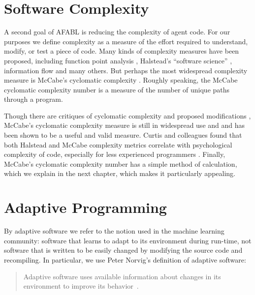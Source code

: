 



\section{Software Complexity}

A second goal of AFABL is reducing the complexity of agent code. For our purposes we define complexity as a measure of the effort required to understand, modify, or test a piece of code. Many kinds of complexity measures have been proposed, including function point analysis \cite{albrecht1979measuring}, Halstead's ``software science'' \cite{halstead1977elements}, information flow \cite{henry1981software} and many others. But perhaps the most widespread complexity measure is McCabe's cyclomatic complexity \cite{mccabe1976complexity,mccabe1989design}. Roughly speaking, the McCabe cyclomatic complexity number is a measure of the number of unique paths through a program.

Though there are critiques of cyclomatic complexity
\cite{gill1991cyclomatic} and proposed modifications \cite{weyuker1988evaluating}, McCabe's cyclomatic complexity measure is still in widespread use and and has been shown to be a useful and valid measure. Curtis and colleagues found that both Halstead and McCabe complexity metrics correlate with psychological complexity of code, especially for less experienced programmers \cite{curtis1979measuring}. Finally, McCabe's cyclomatic complexity number has a simple method of calculation, which we explain in the next chapter, which makes it particularly appealing.

\section{Adaptive Programming}

By adaptive software we refer to the notion used in the machine learning community: software that learns to adapt to its environment during run-time, not software that is written to be easily changed by modifying the source code and recompiling.  In particular, we use Peter Norvig's definition of adaptive software:

\begin{quote}
Adaptive software uses available information about changes in its
environment to improve its behavior~\cite{norvig1998adaptive}.
\end{quote}

